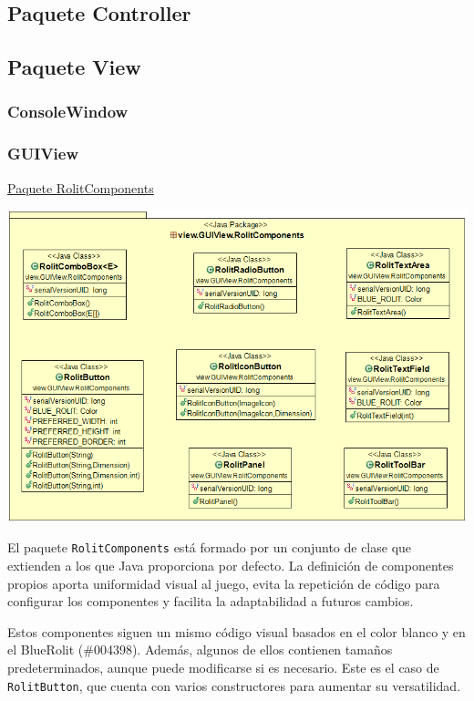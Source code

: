 \documentclass[12pt,a4paper,openright]{book}
\theoremstyle{break}
\begin{document}
\subsection{Paquete Controller}

\subsection{Paquete View}
\subsubsection{ConsoleWindow}

\newpage
\subsubsection{GUIView}
\underline{Paquete RolitComponents}
\begin{center}
\includegraphics[scale=0.5]{RolitComponents.png} 
\end{center}

El paquete \texttt{RolitComponents} está formado por un conjunto de clase que extienden a los que Java proporciona por defecto. La definición de componentes propios aporta uniformidad visual al juego, evita la repetición de código para configurar los componentes y facilita la adaptabilidad a futuros cambios.

Estos componentes siguen un mismo código visual basados en el color blanco y en el BlueRolit (\#004398). Además, algunos de ellos contienen tamaños predeterminados, aunque puede modificarse si es necesario. Este es el caso de \texttt{RolitButton}, que cuenta con varios constructores para aumentar su versatilidad.
\end{document}
